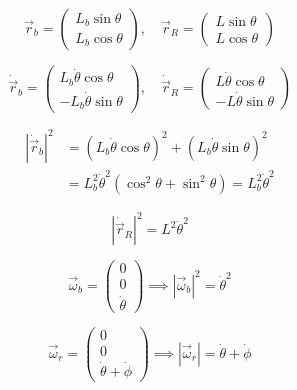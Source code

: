 \documentclass[conference]{IEEEtran}
\begin{document}
\begin{equation}
\vec{r}_b = \begin{pmatrix} L_b \sin\theta \\ L_b \cos\theta \end{pmatrix}, \quad 
\vec{r}_R = \begin{pmatrix} L \sin\theta \\ L \cos\theta \end{pmatrix}
\end{equation}

\begin{equation}
\dot{\vec{r}}_b = \begin{pmatrix} L_b \dot{\theta} \cos\theta \\ -L_b \dot{\theta} \sin\theta \end{pmatrix}, \quad 
\dot{\vec{r}}_R = \begin{pmatrix} L \dot{\theta} \cos\theta \\ -L \dot{\theta} \sin\theta \end{pmatrix}
\end{equation}

\begin{equation}
\begin{aligned}
|\dot{\vec{r}}_b|^2 &= (L_b \dot{\theta} \cos\theta)^2 + (L_b \dot{\theta} \sin\theta)^2 \\
&= L_b^2 \dot{\theta}^2 (\cos^2\theta + \sin^2\theta) = L_b^2 \dot{\theta}^2
\end{aligned}
\end{equation}

\begin{equation}
|\dot{\vec{r}}_R|^2 = L^2 \dot{\theta}^2
\end{equation}


\begin{equation}
\vec{\omega}_b = \begin{pmatrix} 0 \\ 0 \\ \dot{\theta} \end{pmatrix} \implies |\vec{\omega}_b|^2 = \dot{\theta}^2
\end{equation}

\begin{equation}
\vec{\omega}_r = \begin{pmatrix} 0 \\ 0 \\ \dot{\theta} + \dot{\phi} \end{pmatrix} \implies |\vec{\omega}_r| = \dot{\theta} + \dot{\phi}
\end{equation}
\end{document}
